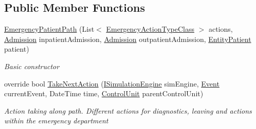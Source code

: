 \subsection*{Public Member Functions}
\begin{DoxyCompactItemize}
\item 
\hyperlink{class_general_health_care_elements_1_1_department_models_1_1_emergency_1_1_emergency_patient_path_a574ebc84260e3009d0078085054415ec}{Emergency\+Patient\+Path} (List$<$ \hyperlink{class_general_health_care_elements_1_1_general_classes_1_1_action_types_and_paths_1_1_emergency_action_type_class}{Emergency\+Action\+Type\+Class} $>$ actions, \hyperlink{class_general_health_care_elements_1_1_treatment_admission_types_1_1_admission}{Admission} inpatient\+Admission, \hyperlink{class_general_health_care_elements_1_1_treatment_admission_types_1_1_admission}{Admission} outpatient\+Admission, \hyperlink{class_general_health_care_elements_1_1_entities_1_1_entity_patient}{Entity\+Patient} patient)
\begin{DoxyCompactList}\small\item\em Basic constructor \end{DoxyCompactList}\item 
override bool \hyperlink{class_general_health_care_elements_1_1_department_models_1_1_emergency_1_1_emergency_patient_path_ab55365a9a704fb73fcc1e9d650b41cbd}{Take\+Next\+Action} (\hyperlink{interface_simulation_core_1_1_simulation_classes_1_1_i_simulation_engine}{I\+Simulation\+Engine} sim\+Engine, \hyperlink{class_simulation_core_1_1_h_c_c_m_elements_1_1_event}{Event} current\+Event, Date\+Time time, \hyperlink{class_simulation_core_1_1_h_c_c_m_elements_1_1_control_unit}{Control\+Unit} parent\+Control\+Unit)
\begin{DoxyCompactList}\small\item\em Action taking along path. Different actions for diagnostics, leaving and actions within the emergency department \end{DoxyCompactList}\end{DoxyCompactItemize}
